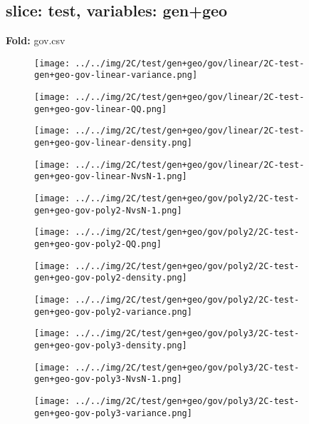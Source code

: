 \subsection{slice: test, variables: gen+geo}
\textbf{Fold:} gov.csv
\begin{figure}[H]
\centering	\texttt{[image: ../../img/2C/test/gen+geo/gov/linear/2C-test-gen+geo-gov-linear-variance.png]}
\end{figure}
\begin{figure}[H]
\centering	\texttt{[image: ../../img/2C/test/gen+geo/gov/linear/2C-test-gen+geo-gov-linear-QQ.png]}
\end{figure}
\begin{figure}[H]
\centering	\texttt{[image: ../../img/2C/test/gen+geo/gov/linear/2C-test-gen+geo-gov-linear-density.png]}
\end{figure}
\begin{figure}[H]
\centering	\texttt{[image: ../../img/2C/test/gen+geo/gov/linear/2C-test-gen+geo-gov-linear-NvsN-1.png]}
\end{figure}
\begin{figure}[H]
\centering	\texttt{[image: ../../img/2C/test/gen+geo/gov/poly2/2C-test-gen+geo-gov-poly2-NvsN-1.png]}
\end{figure}
\begin{figure}[H]
\centering	\texttt{[image: ../../img/2C/test/gen+geo/gov/poly2/2C-test-gen+geo-gov-poly2-QQ.png]}
\end{figure}
\begin{figure}[H]
\centering	\texttt{[image: ../../img/2C/test/gen+geo/gov/poly2/2C-test-gen+geo-gov-poly2-density.png]}
\end{figure}
\begin{figure}[H]
\centering	\texttt{[image: ../../img/2C/test/gen+geo/gov/poly2/2C-test-gen+geo-gov-poly2-variance.png]}
\end{figure}
\begin{figure}[H]
\centering	\texttt{[image: ../../img/2C/test/gen+geo/gov/poly3/2C-test-gen+geo-gov-poly3-density.png]}
\end{figure}
\begin{figure}[H]
\centering	\texttt{[image: ../../img/2C/test/gen+geo/gov/poly3/2C-test-gen+geo-gov-poly3-NvsN-1.png]}
\end{figure}
\begin{figure}[H]
\centering	\texttt{[image: ../../img/2C/test/gen+geo/gov/poly3/2C-test-gen+geo-gov-poly3-variance.png]}
\end{figure}
